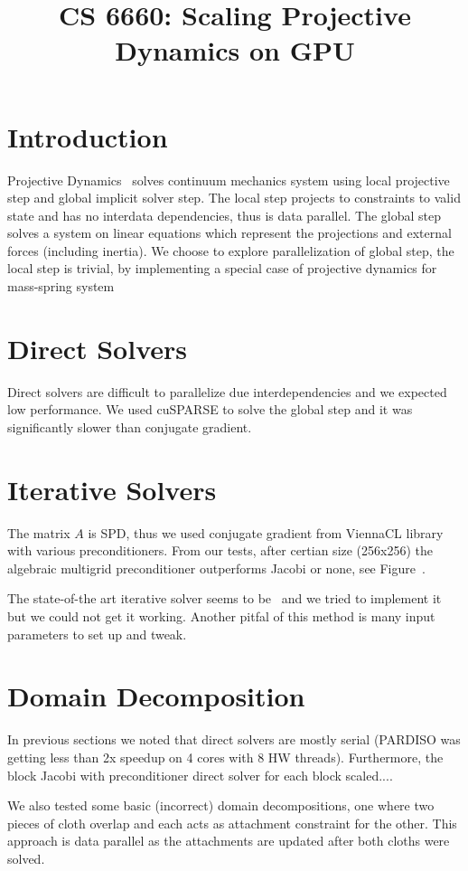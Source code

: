 \documentclass{article}
\title{CS 6660: Scaling Projective Dynamics on GPU}
\begin{document}
\maketitle

\section{Introduction}
Projective Dynamics~\cite{Bouaziz14} solves continuum mechanics system using
local projective step and global implicit solver step. The local step projects
to constraints to valid state and has no interdata dependencies, thus is data
parallel. The global step solves a system on linear equations which represent
the projections and external forces (including inertia). We choose to explore
parallelization of global step, the local step is trivial, by implementing
a special case of projective dynamics for mass-spring system~\cite{Liu13}


\section{Direct Solvers}
Direct solvers are difficult to parallelize due interdependencies and we
expected low performance. We used cuSPARSE to solve the global step and it
was significantly slower than conjugate gradient.


\section{Iterative Solvers}
The matrix $A$ is SPD, thus we used conjugate gradient from ViennaCL library
with various preconditioners. From our tests, after certian size (256x256)
the algebraic multigrid preconditioner outperforms Jacobi or none,
see Figure~.

The state-of-the art iterative solver seems to be~\cite{Wang15} and we tried
to implement it but we could not get it working. Another pitfal of this method
is many input parameters to set up and tweak.


\section{Domain Decomposition}
In previous sections we noted that direct solvers are mostly serial (PARDISO
was getting less than 2x speedup on 4 cores with 8 HW threads). Furthermore,
the block Jacobi with preconditioner direct solver for each block scaled....

We also tested some basic (incorrect) domain decompositions, one where two
pieces of cloth overlap and each acts as attachment constraint for the other.
This approach is data parallel as the attachments are updated after both
cloths were solved.
\end{document}
